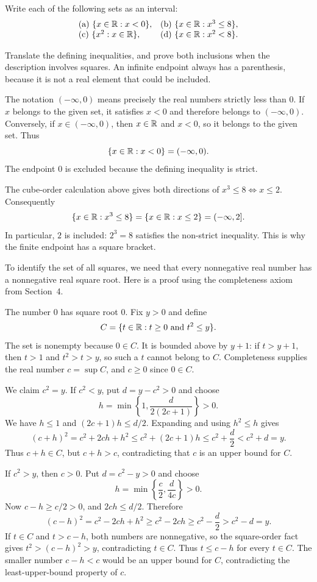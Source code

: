 \goal Write each of the following sets as an interval:
\[
 \begin{array}{ll}
 \text{(a)}\ \{x\in\mathbb{R}:x<0\},&
 \text{(b)}\ \{x\in\mathbb{R}:x^3\le8\},\\
 \text{(c)}\ \{x^2:x\in\mathbb{R}\},&
 \text{(d)}\ \{x\in\mathbb{R}:x^2<8\}.
 \end{array}
\]

\idea Translate the defining inequalities, and prove both inclusions
when the description involves squares. An infinite endpoint always has
a parenthesis, because it is not a real element that could be included.

The notation $(-\infty,0)$ means precisely the real numbers strictly
less than $0$. If $x$ belongs to the given set, it satisfies $x<0$ and
therefore belongs to $(-\infty,0)$. Conversely, if $x\in(-\infty,0)$,
then $x\in\mathbb{R}$ and $x<0$, so it belongs to the given set. Thus
\[
 \{x\in\mathbb{R}:x<0\}=(-\infty,0).
\]
The endpoint $0$ is excluded because the defining inequality is strict.

The cube-order calculation above gives both directions of
$x^3\le8\Longleftrightarrow x\le2$. Consequently
\[
 \{x\in\mathbb{R}:x^3\le8\}=\{x\in\mathbb{R}:x\le2\}=(-\infty,2].
\]
In particular, $2$ is included: $2^3=8$ satisfies the non-strict
inequality. This is why the finite endpoint has a square bracket.

To identify the set of all squares, we need that every nonnegative real
number has a nonnegative real square root. Here is a proof using the
completeness axiom from Section~4.

The number $0$ has square root $0$. Fix $y>0$ and define
\[
 C=\{t\in\mathbb{R}:t\ge0\text{ and }t^2\le y\}.
\]
The set is nonempty because $0\in C$. It is bounded above by $y+1$:
if $t>y+1$, then $t>1$ and
$t^2>t>y$, so such a $t$ cannot belong to $C$. Completeness supplies
the real number $c=\sup C$, and $c\ge0$ since $0\in C$.

We claim $c^2=y$. If $c^2<y$, put $d=y-c^2>0$ and choose
\[
 h=\min\left\{1,\frac{d}{2(2c+1)}\right\}>0.
\]
We have $h\le1$ and $(2c+1)h\le d/2$. Expanding and using
$h^2\le h$ gives
\[
 (c+h)^2=c^2+2ch+h^2
 \le c^2+(2c+1)h
 \le c^2+\frac d2
 <c^2+d=y.
\]
Thus $c+h\in C$, but $c+h>c$, contradicting that $c$ is an upper
bound for $C$.

If $c^2>y$, then $c>0$. Put $d=c^2-y>0$ and choose
\[
 h=\min\left\{\frac c2,\frac{d}{4c}\right\}>0.
\]
Now $c-h\ge c/2>0$, and $2ch\le d/2$. Therefore
\[
 (c-h)^2=c^2-2ch+h^2
 \ge c^2-2ch
 \ge c^2-\frac d2
 >c^2-d=y.
\]
If $t\in C$ and $t>c-h$, both numbers are nonnegative, so the
square-order fact gives $t^2>(c-h)^2>y$, contradicting $t\in C$.
Thus $t\le c-h$ for every $t\in C$. The smaller number $c-h<c$
would be an upper bound for $C$, contradicting the least-upper-bound
property of $c$.

